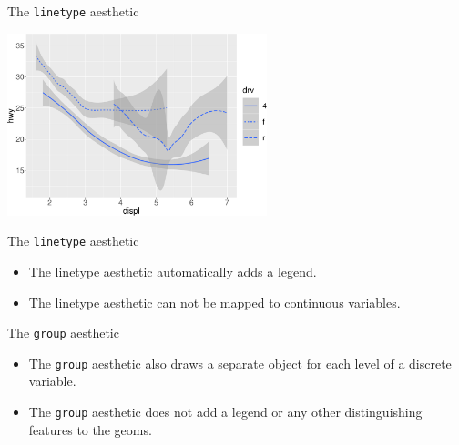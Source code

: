\documentclass[ignorenonframetext,]{beamer}
\providecommand{\tightlist}{%
  \setlength{\itemsep}{0pt}\setlength{\parskip}{0pt}}
\begin{document}
\begin{frame}{The \texttt{linetype} aesthetic}
\protect\hypertarget{the-linetype-aesthetic-1}{}

\begin{center}\includegraphics[height=200px]{data-visualization_files/figure-beamer/unnamed-chunk-29-1} \end{center}

\end{frame}

\begin{frame}{The \texttt{linetype} aesthetic}
\protect\hypertarget{the-linetype-aesthetic-2}{}

\begin{itemize}
\tightlist
\item
  The linetype aesthetic automatically adds a legend.
\item
  The linetype aesthetic can not be mapped to continuous variables.
\end{itemize}

\end{frame}

\begin{frame}[fragile]{The \texttt{group} aesthetic}
\protect\hypertarget{the-group-aesthetic}{}

\begin{itemize}
\item
  The \texttt{group} aesthetic also draws a separate object for each
  level of a discrete variable.
\item
  The \texttt{group} aesthetic does not add a legend or any other
  distinguishing features to the geoms.
\end{itemize}

\end{frame}
\end{document}
